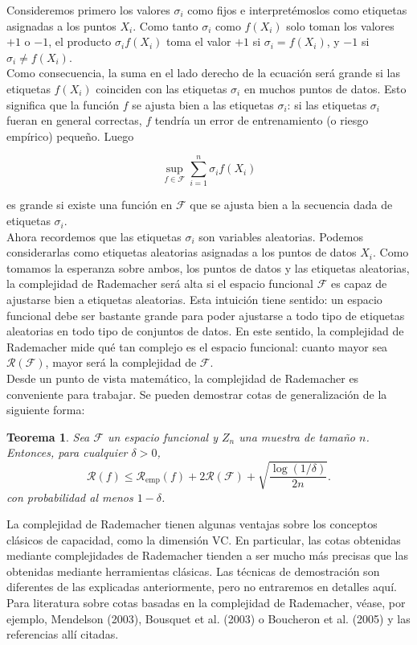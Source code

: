 \documentclass{article}
\newtheorem{thm}{Teorema}[subsection]
\begin{document}
Consideremos primero los valores \(\sigma_i\) como fijos e interpretémoslos como etiquetas asignadas a los puntos \(X_i\). Como tanto 
\(\sigma_i\) como \(f(X_i)\) solo toman los valores \(+1\) o \(-1\), el producto \(\sigma_i f(X_i)\) toma el 
valor \(+1\) si \(\sigma_i = f(X_i)\), y \(-1\) si \(\sigma_i \neq f(X_i)\). \\

Como consecuencia, la suma en el lado derecho de la ecuación será grande si las etiquetas \(f(X_i)\) 
coinciden con las etiquetas \(\sigma_i\) en muchos puntos de datos. Esto significa que la función \(f\) 
se ajusta bien a las etiquetas \(\sigma_i\): si las etiquetas \(\sigma_i\) fueran en general correctas, 
\(f\) tendría un error de entrenamiento (o riesgo empírico) pequeño. Luego

\[
\sup_{f \in \mathcal{F}} \sum_{i=1}^{n} \sigma_i f(X_i)
\]

es grande si existe una función en \(\mathcal{F}\) que se ajusta bien a la secuencia dada de etiquetas \(\sigma_i\). \\

Ahora recordemos que las etiquetas \(\sigma_i\) son variables aleatorias. Podemos considerarlas 
como etiquetas aleatorias asignadas a los puntos de datos \(X_i\). Como tomamos la esperanza sobre ambos, los 
puntos de datos y las etiquetas aleatorias, la complejidad de Rademacher será alta si el espacio funcional 
\(\mathcal{F}\) es capaz de ajustarse bien a etiquetas aleatorias. Esta intuición tiene sentido: un espacio 
funcional debe ser bastante grande para poder ajustarse a todo tipo de etiquetas aleatorias en todo tipo de 
conjuntos de datos. En este sentido, la complejidad de Rademacher mide qué tan complejo es el espacio 
funcional: cuanto mayor sea \(\mathscr{R}(\mathcal{F})\), mayor será la complejidad de \(\mathcal{F}\).\\

Desde un punto de vista matemático, la complejidad de Rademacher es conveniente para trabajar. Se pueden 
demostrar cotas de generalización de la siguiente forma:
\begin{thm}
    Sea $\mathcal{F}$ un espacio funcional y $Z_n$ una muestra de tamaño $n$. Entonces, para cualquier $\delta > 0$,
\[
\mathcal{R}(f) \leq \mathcal{R}_{\text{emp}}(f) + 2\mathscr{R}(\mathcal{F}) + \sqrt{\frac{\log(1/\delta)}{2n}}.
\]
con probabilidad al menos \(1 - \delta\).\\
\end{thm}


La complejidad de Rademacher tienen algunas ventajas sobre los conceptos clásicos de capacidad, como la 
dimensión VC. En particular, las cotas obtenidas mediante complejidades de Rademacher tienden a ser mucho más 
precisas que las obtenidas mediante herramientas clásicas. Las técnicas de demostración son diferentes de las 
explicadas anteriormente, pero no entraremos en detalles aquí. Para literatura sobre cotas basadas en la 
complejidad de Rademacher, véase, por ejemplo, Mendelson (2003), Bousquet et al. (2003) o Boucheron et al. 
(2005) y las referencias allí citadas.\\
\end{document}
